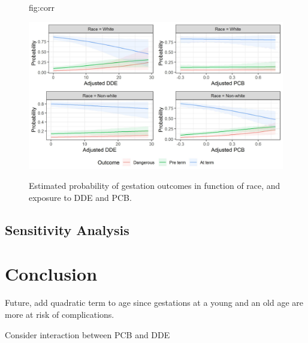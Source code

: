 \documentclass[wcp]{jmlr}%
\begin{document}
\begin{figure}[htbp]
	\floatconts
	{fig:corr}
	{\caption{Estimated probability of gestation outcomes in function of race, and exposure to DDE and PCB.}}
	{\includegraphics[width=0.8\linewidth]{results}}
\end{figure}



\subsection{Sensitivity Analysis}

\section{Conclusion}
\label{sec:conclusion}

Future, add quadratic term to age since gestations at a young and an old age are more at risk of complications.

Consider interaction between PCB and DDE

%
\end{document}
